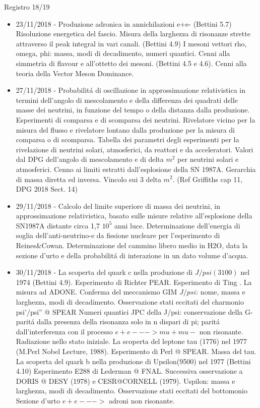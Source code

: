 \begin{frame}[allowframebreaks]{Registro 18/19}
\begin{itemize}
\item 23/11/2018 - Produzione adronica in annichilazioni e+e- (Bettini 5.7) Risoluzione energetica del fascio. Misura della larghezza di risonanze strette attraverso il peak integral in vari canali. (Bettini 4.9) I mesoni vettori rho, omega, phi: massa, modi di decadimento, numeri quantici. Cenni alla simmetria di flavour e all'ottetto dei mesoni. (Bettini 4.5 e 4.6). Cenni alla teoria della Vector Meson Dominance.
\item 27/11/2018 - Probabilit\'a di oscillazione in approssimazione relativistica in termini dell'angolo di mescolamento e della differenza dei quadrati delle masse dei neutrini, in funzione del tempo o della distanza dalla produzione. Esperimenti di comparsa e di scomparsa dei neutrini. Rivelatore vicino per la misura del flusso e rivelatore lontano dalla produzione per la misura di comparsa o di scomparsa. Tabella dei parametri degli esperimenti per la rivelazione di neutrini solari, atmosferici, da reattori e da acceleratori. Valori dal DPG dell'angolo di mescolamento e di delta $m^2$ per neutrini solari e atmosferici. Cenno ai limiti estratti dall'esplosione della SN 1987A. Gerarchia di massa diretta ed inversa. Vincolo sui 3 delta $m^2$. (Ref Griffiths cap 11, DPG 2018 Sect. 14)
\item 29/11/2018 - Calcolo del limite superiore di massa dei neutrini, in approssimazione relativistica, basato sulle misure relative all'esplosione della SN1987A distante circa 1,7 $10^5$ anni luce. Determinazione dell'energia di soglia dell'anti-neutrino-e da fissione nucleare per l'esperimento di Reines\&Cowan. Determinazione del cammino libero medio in H2O, data la sezione d'urto e della probabilit\'a di interazione in un dato volume d'acqua.
\item 30/11/2018 - La scoperta del quark c nella produzione di $J/psi(3100)$ nel  1974 (Bettini 4.9). Esperimento di Richter \@ PEAR. Esperimento di Ting \@BNL. La misura ad ADONE. Conferma del meccanismo GIM $J/psi$: nome, massa e larghezza, modi di decadimento. Osservazione stati eccitati del charmonio psi'/psi'' @ SPEAR Numeri quantici JPC della J/psi: conservazione della G-parit\'a dalla presenza della risonanza solo in n dispari di pi; parit\'a dall'interferenza con il processo $e+e--->mu+mu-$ non risonante. Radiazione nello stato iniziale. La scoperta del leptone tau (1776) nel 1977 (M.Perl Nobel Lecture, 1988). Esperimento di Perl @ SPEAR. Massa del tau. La scoperta del quark b nella produzione di Upsilon(9500) nel 1977 (Bettini 4.10) Esperimento E288 di Lederman @ FNAL. Successiva osservazione a DORIS @ DESY (1978) e CESR@CORNELL (1979). Uspilon: massa e larghezza, modi di decadimento. Osservazione stati eccitati del bottomonio Sezione d'urto $e+e- -->$ adroni non risonante.

\end{itemize}
\end{frame}
